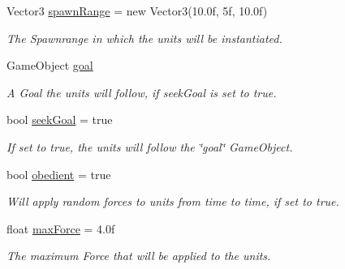 \begin{DoxyCompactItemize}
Vector3 \hyperlink{class_p_s_flocking_1_1_p_s_unit_manager_aa9c3797d524485b906ca919640f80c57}{spawn\+Range} = new Vector3(10.\+0f, 5f, 10.\+0f)
\begin{DoxyCompactList}\small\item\em The Spawnrange in which the units will be instantiated. \end{DoxyCompactList}\item 
\mbox{\label{class_p_s_flocking_1_1_p_s_unit_manager_acab1025d71a518ffd6fdecfbeef80b0a}} 
Game\+Object \hyperlink{class_p_s_flocking_1_1_p_s_unit_manager_acab1025d71a518ffd6fdecfbeef80b0a}{goal}
\begin{DoxyCompactList}\small\item\em A Goal the units will follow, if seek\+Goal is set to true. \end{DoxyCompactList}\item 
\mbox{\label{class_p_s_flocking_1_1_p_s_unit_manager_ae308dcd912212ae803fd6d9c48b25288}} 
bool \hyperlink{class_p_s_flocking_1_1_p_s_unit_manager_ae308dcd912212ae803fd6d9c48b25288}{seek\+Goal} = true
\begin{DoxyCompactList}\small\item\em If set to true, the units will follow the \char`\"{}goal\char`\"{} Game\+Object. \end{DoxyCompactList}\item 
\mbox{\label{class_p_s_flocking_1_1_p_s_unit_manager_a6ee39d3bff7f5f98b688738c82dbfbf3}} 
bool \hyperlink{class_p_s_flocking_1_1_p_s_unit_manager_a6ee39d3bff7f5f98b688738c82dbfbf3}{obedient} = true
\begin{DoxyCompactList}\small\item\em Will apply random forces to units from time to time, if set to true. \end{DoxyCompactList}\item 
\mbox{\label{class_p_s_flocking_1_1_p_s_unit_manager_ad4a71076e0bd500485ef978e3a71ea8e}} 
float \hyperlink{class_p_s_flocking_1_1_p_s_unit_manager_ad4a71076e0bd500485ef978e3a71ea8e}{max\+Force} = 4.\+0f
\begin{DoxyCompactList}\small\item\em The maximum Force that will be applied to the units. \end{DoxyCompactList}\item 

\end{DoxyCompactItemize}
